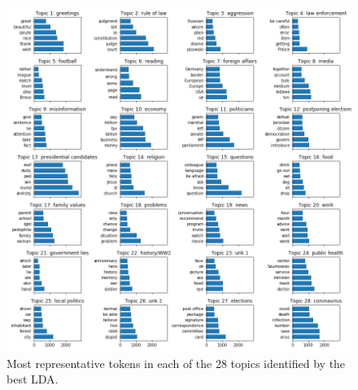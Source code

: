 \documentclass{article}
\begin{document}
	\begin{figure}[!ht]
		\includegraphics[width=\columnwidth]{figures/topic_tokens_en.png}
		\caption{Most representative tokens in each of the 28 topics identified by the best LDA.}
		\label{fig:topic_tokens}
	\end{figure}
\end{document}

